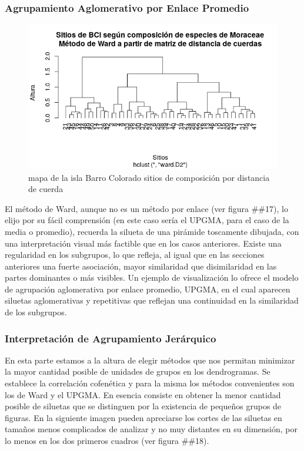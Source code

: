 \documentclass[11pt,]{article}
\begin{document}
\subsubsection{Agrupamiento Aglomerativo por Enlace
Promedio}\label{agrupamiento-aglomerativo-por-enlace-promedio}

\begin{figure}
\centering
\includegraphics[width=1.00000\textwidth]{sitios_metodo_ward.png}
\caption{mapa de la isla Barro Colorado sitios de composición por
distancia de cuerda \label{fig:bci_map}}
\end{figure}

El método de Ward, aunque no es un método por enlace (ver figura
\#\#17), lo elijo por su fácil comprensión (en este caso sería el UPGMA,
para el caso de la media o promedio), recuerda la silueta de una
pirámide toscamente dibujada, con una interpretación visual más factible
que en los casos anteriores. Existe una regularidad en los subgrupos, lo
que refleja, al igual que en las secciones anteriores una fuerte
asociación, mayor similaridad que disimilaridad en las partes dominantes
o más visibles. Un ejemplo de visualización lo ofrece el modelo de
agrupación aglomerativa por enlace promedio, UPGMA, en el cual aparecen
siluetas aglomerativas y repetitivas que reflejan una continuidad en la
similaridad de los subgrupos.

\subsubsection{Interpretación de Agrupamiento
Jerárquico}\label{interpretaciuxf3n-de-agrupamiento-jeruxe1rquico}

En esta parte estamos a la altura de elegir métodos que nos permitan
minimizar la mayor cantidad posible de unidades de grupos en los
dendrogramas. Se establece la correlación cofenética y para la misma los
métodos convenientes son los de Ward y el UPGMA. En esencia consiste en
obtener la menor cantidad posible de siluetas que se distinguen por la
existencia de pequeños grupos de figuras. En la siguiente imagen pueden
apreciarse los cortes de las siluetas en tamaños menos complicados de
analizar y no muy distantes en su dimensión, por lo menos en los dos
primeros cuadros (ver figura \#\#18).
\end{document}
